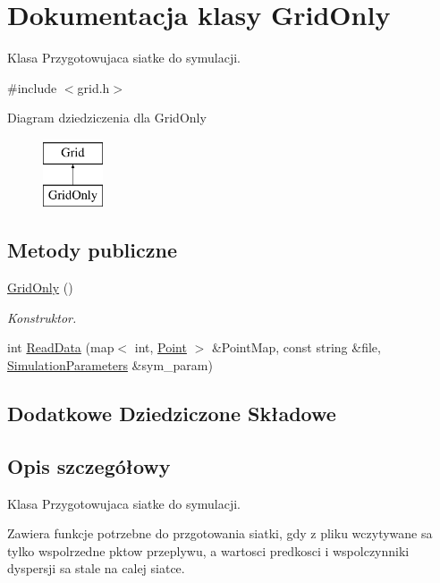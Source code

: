 \hypertarget{class_grid_only}{}\section{Dokumentacja klasy Grid\+Only}
\label{class_grid_only}


Klasa Przygotowujaca siatke do symulacji.  




{\ttfamily \#include $<$grid.\+h$>$}

Diagram dziedziczenia dla Grid\+Only\begin{figure}[H]
\begin{center}
\leavevmode
\includegraphics[height=2.000000cm]{class_grid_only}
\end{center}
\end{figure}
\subsection*{Metody publiczne}
\begin{DoxyCompactItemize}
\item 
\hyperlink{class_grid_only_a71437d24648d7d4db8836eefbda7a360}{Grid\+Only} ()
\begin{DoxyCompactList}\small\item\em Konstruktor. \end{DoxyCompactList}\item 
int \hyperlink{class_grid_only_a86e143a957ba61c0a5b215b65ea24902}{Read\+Data} (map$<$ int, \hyperlink{class_point}{Point} $>$ \&Point\+Map, const string \&file, \hyperlink{class_simulation_parameters}{Simulation\+Parameters} \&sym\+\_\+param)
\end{DoxyCompactItemize}
\subsection*{Dodatkowe Dziedziczone Składowe}


\subsection{Opis szczegółowy}
Klasa Przygotowujaca siatke do symulacji. 

Zawiera funkcje potrzebne do przgotowania siatki, gdy z pliku wczytywane sa tylko wspolrzedne pktow przeplywu, a wartosci predkosci i wspolczynniki dyspersji sa stale na calej siatce. 

